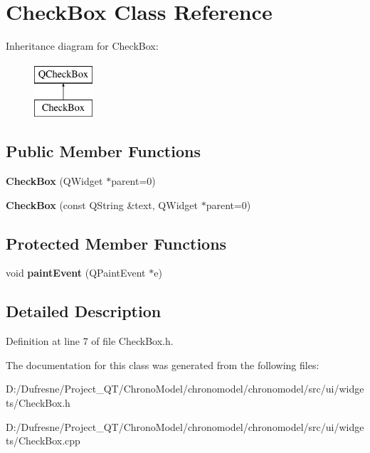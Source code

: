 \hypertarget{class_check_box}{\section{Check\-Box Class Reference}
\label{class_check_box}
}
Inheritance diagram for Check\-Box\-:\begin{figure}[H]
\begin{center}
\leavevmode
\includegraphics[height=2.000000cm]{class_check_box}
\end{center}
\end{figure}
\subsection*{Public Member Functions}
\begin{DoxyCompactItemize}
\item 
\hypertarget{class_check_box_a3342dccde989d4d22f9e0b04ab4be31b}{{\bfseries Check\-Box} (Q\-Widget $\ast$parent=0)}\label{class_check_box_a3342dccde989d4d22f9e0b04ab4be31b}

\item 
\hypertarget{class_check_box_ac0437df7eefe8427df04ef5f0d56f8fa}{{\bfseries Check\-Box} (const Q\-String \&text, Q\-Widget $\ast$parent=0)}\label{class_check_box_ac0437df7eefe8427df04ef5f0d56f8fa}

\end{DoxyCompactItemize}
\subsection*{Protected Member Functions}
\begin{DoxyCompactItemize}
\item 
\hypertarget{class_check_box_ab8eb710b5bcd68cb28e20fcc2eed06ca}{void {\bfseries paint\-Event} (Q\-Paint\-Event $\ast$e)}\label{class_check_box_ab8eb710b5bcd68cb28e20fcc2eed06ca}

\end{DoxyCompactItemize}


\subsection{Detailed Description}


Definition at line 7 of file Check\-Box.\-h.



The documentation for this class was generated from the following files\-:\begin{DoxyCompactItemize}
\item 
D\-:/\-Dufresne/\-Project\-\_\-\-Q\-T/\-Chrono\-Model/chronomodel/chronomodel/src/ui/widgets/Check\-Box.\-h\item 
D\-:/\-Dufresne/\-Project\-\_\-\-Q\-T/\-Chrono\-Model/chronomodel/chronomodel/src/ui/widgets/Check\-Box.\-cpp\end{DoxyCompactItemize}
